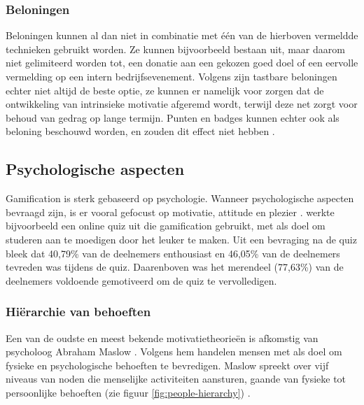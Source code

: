 \subsubsection{Beloningen}
Beloningen kunnen al dan niet in combinatie met één van de hierboven vermeldde technieken gebruikt worden. Ze kunnen bijvoorbeeld bestaan uit, maar daarom niet gelimiteerd worden tot, een donatie aan een gekozen goed doel of een eervolle vermelding op een intern bedrijfsevenement.
Volgens \textcite{Lewis2016} zijn tastbare beloningen echter niet altijd de beste optie, ze kunnen er namelijk voor zorgen dat de ontwikkeling van intrinsieke motivatie afgeremd wordt, terwijl deze net zorgt voor behoud van gedrag op lange termijn. Punten en badges kunnen echter ook als beloning beschouwd worden, en zouden dit effect niet hebben \autocite{Lewis2016}.

\subsection{Psychologische aspecten}
Gamification is sterk gebaseerd op psychologie. Wanneer psychologische aspecten bevraagd zijn, is er vooral gefocust op motivatie, attitude en plezier \autocite{Hamari2014}. \textcite{Cheong2013} werkte bijvoorbeeld een online quiz uit die gamification gebruikt, met als doel om studeren aan te moedigen door het leuker te maken. Uit een bevraging  na de quiz bleek dat 40,79\% van de deelnemers enthousiast en 46,05\% van de deelnemers tevreden was tijdens de quiz. Daarenboven was het merendeel (77,63\%) van de deelnemers voldoende gemotiveerd om de quiz te vervolledigen.

\subsubsection{Hiërarchie van behoeften}
Een van de oudste en meest bekende motivatietheorieën is afkomstig van psycholoog Abraham Maslow \autocite{Richter2014}. Volgens hem handelen mensen met als doel om fysieke en psychologische behoeften te bevredigen. Maslow spreekt over vijf niveaus van noden die menselijke activiteiten aansturen, gaande van fysieke tot persoonlijke behoeften (zie figuur \ref{fig:people-hierarchy}) \autocite{Lilienfeld2014}.

